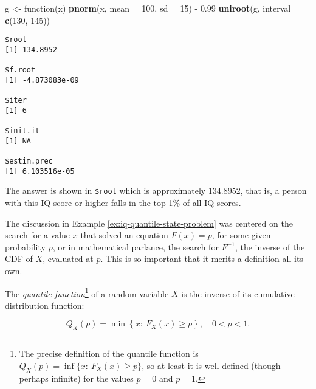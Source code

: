 \documentclass[]{book}
\newenvironment{Shaded}{\begin{snugshade}}{\end{snugshade}}
\newcommand{\KeywordTok}[1]{\textcolor[rgb]{0.13,0.29,0.53}{\textbf{{#1}}}}
\newcommand{\DataTypeTok}[1]{\textcolor[rgb]{0.13,0.29,0.53}{{#1}}}
\newcommand{\DecValTok}[1]{\textcolor[rgb]{0.00,0.00,0.81}{{#1}}}
\newcommand{\FloatTok}[1]{\textcolor[rgb]{0.00,0.00,0.81}{{#1}}}
\newcommand{\StringTok}[1]{\textcolor[rgb]{0.31,0.60,0.02}{{#1}}}
\newcommand{\NormalTok}[1]{{#1}}
\let\rmarkdownfootnote\footnote%
\def\footnote{\protect\rmarkdownfootnote}
\numberwithin{equation}{chapter}
\numberwithin{figure}{chapter}
\theoremstyle{plain}
\theoremstyle{definition}
\theoremstyle{remark}
\theoremstyle{definition}
\theoremstyle{definition}
\theoremstyle{remark}
\let\BeginKnitrBlock\begin \let\EndKnitrBlock\end
\begin{document}
\begin{Shaded}
\begin{Highlighting}[]
\NormalTok{g <-}\StringTok{ }\NormalTok{function(x) }\KeywordTok{pnorm}\NormalTok{(x, }\DataTypeTok{mean =} \DecValTok{100}\NormalTok{, }\DataTypeTok{sd =} \DecValTok{15}\NormalTok{) -}\StringTok{ }\FloatTok{0.99}
\KeywordTok{uniroot}\NormalTok{(g, }\DataTypeTok{interval =} \KeywordTok{c}\NormalTok{(}\DecValTok{130}\NormalTok{, }\DecValTok{145}\NormalTok{))}
\end{Highlighting}
\end{Shaded}

\begin{verbatim}
$root
[1] 134.8952

$f.root
[1] -4.873083e-09

$iter
[1] 6

$init.it
[1] NA

$estim.prec
[1] 6.103516e-05
\end{verbatim}

The answer is shown in \texttt{\$root} which is approximately 134.8952,
that is, a person with this IQ score or higher falls in the top 1\% of
all IQ scores.

The discussion in Example \ref{ex:iq-quantile-state-problem} was
centered on the search for a value \(x\) that solved an equation
\(F(x)=p\), for some given probability \(p\), or in mathematical
parlance, the search for \(F^{-1}\), the inverse of the CDF of \(X\),
evaluated at \(p\). This is so important that it merits a definition all
its own.

\bigskip

\BeginKnitrBlock{definition}
\protect\hypertarget{def:unnamed-chunk-269}{}{\label{def:unnamed-chunk-269}}The
\emph{quantile function}\footnote{The precise definition of the quantile
  function is \(Q_{X}(p)=\inf \{ x:\ F_{X}(x)\geq p \}\), so at least it
  is well defined (though perhaps infinite) for the values \(p=0\) and
  \(p=1\).} of a random variable \(X\) is the inverse of its cumulative
distribution function:

\begin{equation}
Q_{X}(p)=\min\left\{ x:\ F_{X}(x)\geq p\right\} ,\quad 0 < p <1.
\end{equation}
\EndKnitrBlock{definition}

\bigskip
\end{document}
